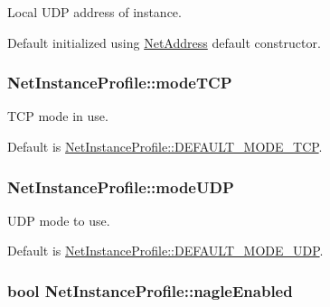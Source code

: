 Local UDP address of instance. 

Default initialized using \hyperlink{class_net_address}{NetAddress} default constructor. \hypertarget{class_net_instance_profile_acfc65e0440c83e5e5fa35f3480d8db3e}{
\subsubsection[{modeTCP}]{ {\bf NetInstanceProfile::modeTCP}}}
\label{class_net_instance_profile_acfc65e0440c83e5e5fa35f3480d8db3e}


TCP mode in use. 

Default is \hyperlink{class_net_instance_profile_ad1d027ea1d01003564961be529fd5766}{NetInstanceProfile::DEFAULT\_\-MODE\_\-TCP}. \hypertarget{class_net_instance_profile_a6f7dcc6d649e11ab2f9c9cf99dd74313}{
\subsubsection[{modeUDP}]{ {\bf NetInstanceProfile::modeUDP}}}
\label{class_net_instance_profile_a6f7dcc6d649e11ab2f9c9cf99dd74313}


UDP mode to use. 

Default is \hyperlink{class_net_instance_profile_a247c5f6aeb339edcb8f01a66a592bf3c}{NetInstanceProfile::DEFAULT\_\-MODE\_\-UDP}. \hypertarget{class_net_instance_profile_a959f0b77c0e19d4f425c5c36b601ec8c}{
\subsubsection[{nagleEnabled}]{\setlength{\rightskip}{0pt plus 5cm}bool {\bf NetInstanceProfile::nagleEnabled}}}
\label{class_net_instance_profile_a959f0b77c0e19d4f425c5c36b601ec8c}


